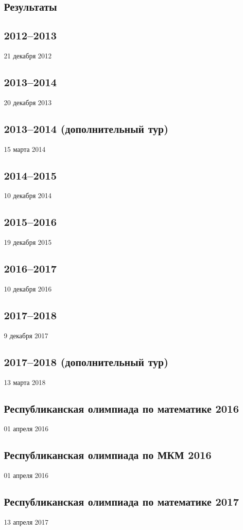 \documentclass[12pt, a5paper]{article}
\newcommand{\header}[2]
{
	\subsection{{#1}}
	\begin{center}
	#2
	\end{center}
}
\begin{document}
\begin{landscape}

\section{Результаты}

\begin{scriptsize}


\header{2012--2013}{21 декабря 2012}

\newpage

\header{2013--2014}{20 декабря 2013}

\newpage

\header{2013--2014 (дополнительный тур)}{15 марта 2014}

\newpage

\header{2014--2015}{10 декабря 2014}

\newpage

\header{2015--2016}{19 декабря 2015}

\newpage

\header{2016--2017}{10 декабря 2016}

\newpage

\header{2017--2018}{9 декабря 2017}

\newpage

\header{2017--2018 (дополнительный тур)}{13 марта 2018}

\newpage

\header{Республиканская олимпиада по математике 2016}{01 апреля 2016}

\newpage

\header{Республиканская олимпиада по МКМ 2016}{01 апреля 2016}

\newpage

\header{Республиканская олимпиада по математике 2017}{13 апреля 2017}

\newpage

\end{scriptsize}
\end{landscape}
\end{document}
